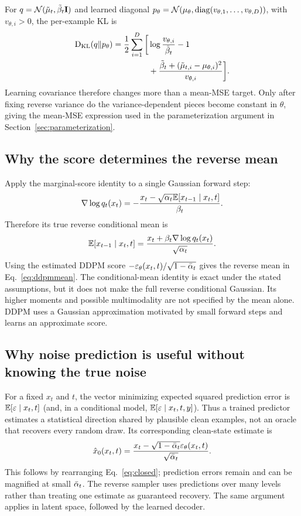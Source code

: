 For $q=\mathcal{N}(\tilde\mu_t,\tilde\beta_t\mathbf{I})$ and learned diagonal
$p_\theta=\mathcal{N}(\mu_\theta,\operatorname{diag}(v_{\theta,1},\ldots,v_{\theta,D}))$,
with $v_{\theta,i}>0$, the per-example KL is
\begin{equation}
\begin{aligned}
\operatorname{D_{KL}}(q\|p_\theta)=\frac12\sum_{i=1}^D\bigg[
&\log\frac{v_{\theta,i}}{\tilde\beta_t}-1\\
&+\frac{\tilde\beta_t+(\tilde\mu_{t,i}-\mu_{\theta,i})^2}{v_{\theta,i}}
\bigg].
\end{aligned}
\end{equation}
Learning covariance therefore changes more than a mean-MSE target.
Only after fixing reverse variance do the variance-dependent pieces
become constant in $\theta$, giving the mean-MSE expression used in
the parameterization argument in Section~\ref{sec:parameterization}.

\subsection{Why the score determines the reverse mean}\label{app:reversemean}
Apply the marginal-score identity to a single Gaussian forward step:
\begin{equation}
\nabla\log q_t(x_t)
=-\frac{x_t-\sqrt{\alpha_t}\mathbb{E}[x_{t-1}\mid x_t,t]}{\beta_t}.
\end{equation}
Therefore its true reverse conditional mean is
\begin{equation}
\mathbb{E}[x_{t-1}\mid x_t,t]
=\frac{x_t+\beta_t\nabla\log q_t(x_t)}{\sqrt{\alpha_t}}.
\end{equation}
Using the estimated DDPM score
$-\varepsilon_\theta(x_t,t)/\sqrt{1-\bar{\alpha}_t}$ gives the reverse mean in
Eq.~\eqref{eq:ddpmmean}. The conditional-mean identity is exact under
the stated assumptions, but it does not make the full reverse
conditional Gaussian. Its higher moments and possible multimodality
are not specified by the mean alone. DDPM uses a Gaussian approximation
motivated by small forward steps and learns an approximate score.

\subsection{Why noise prediction is useful without knowing the true noise}\label{app:noiseinterpretation}
For a fixed $x_t$ and $t$, the vector minimizing expected squared prediction
error is $\mathbb{E}[\varepsilon\mid x_t,t]$ (and, in a conditional model,
$\mathbb{E}[\varepsilon\mid x_t,t,y]$). Thus a trained predictor estimates a statistical
direction shared by plausible clean examples, not an oracle that recovers
every random draw. Its corresponding clean-state estimate is
\begin{equation}
\hat x_0(x_t,t)=
\frac{x_t-\sqrt{1-\bar{\alpha}_t}\varepsilon_\theta(x_t,t)}{\sqrt{\bar{\alpha}_t}}.
\end{equation}
This follows by rearranging Eq.~\eqref{eq:closed}; prediction errors remain
and can be magnified at small $\bar{\alpha}_t$. The reverse sampler uses predictions
over many levels rather than treating one estimate as guaranteed recovery.
The same argument applies in latent space, followed by the learned decoder.

